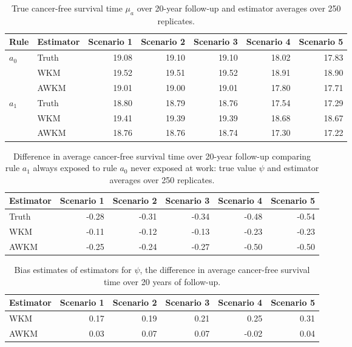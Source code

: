 \documentclass[
  11pt,
]{article}
\begin{document}
\begin{table}[H]
\centering
\caption{True cancer-free survival time $\mu_{a}$ over 20-year follow-up and estimator averages over 250 replicates.} 
\label{tab:survival}
\begin{tabular}{llrrrrr}
  \toprule
Rule & Estimator & Scenario 1 & Scenario 2 & Scenario 3 & Scenario 4 & Scenario 5 \\ 
  \midrule
$a_0$ & Truth & 19.08 & 19.10 & 19.10 & 18.02 & 17.83 \\ 
   & WKM & 19.52 & 19.51 & 19.52 & 18.91 & 18.90 \\ 
   & AWKM & 19.01 & 19.00 & 19.01 & 17.80 & 17.71 \\ 
   \midrule
$a_1$ & Truth & 18.80 & 18.79 & 18.76 & 17.54 & 17.29 \\ 
   & WKM & 19.41 & 19.39 & 19.39 & 18.68 & 18.67 \\ 
   & AWKM & 18.76 & 18.76 & 18.74 & 17.30 & 17.22 \\ 
   \bottomrule
\end{tabular}
\end{table}
\begin{table}[H]
\centering
\caption{Difference in average cancer-free survival time over 20-year follow-up comparing rule $a_1$ always exposed to rule $a_0$ never exposed at work: true value $\psi$ and estimator averages over 250 replicates.} 
\label{tab:differences}
\begin{tabular}{lrrrrr}
  \toprule
Estimator & Scenario 1 & Scenario 2 & Scenario 3 & Scenario 4 & Scenario 5 \\ 
  \midrule
Truth & -0.28 & -0.31 & -0.34 & -0.48 & -0.54 \\ 
  WKM & -0.11 & -0.12 & -0.13 & -0.23 & -0.23 \\ 
  AWKM & -0.25 & -0.24 & -0.27 & -0.50 & -0.50 \\ 
   \bottomrule
\end{tabular}
\end{table}
\begin{table}[H]
\centering
\caption{Bias estimates of estimators for $\psi$, the difference in average cancer-free survival time over 20 years of follow-up.} 
\label{tab:bias}
\begin{tabular}{lrrrrr}
  \toprule
Estimator & Scenario 1 & Scenario 2 & Scenario 3 & Scenario 4 & Scenario 5 \\ 
  \midrule
WKM & 0.17 & 0.19 & 0.21 & 0.25 & 0.31 \\ 
  AWKM & 0.03 & 0.07 & 0.07 & -0.02 & 0.04 \\ 
   \bottomrule
\end{tabular}
\end{table}
\end{document}
